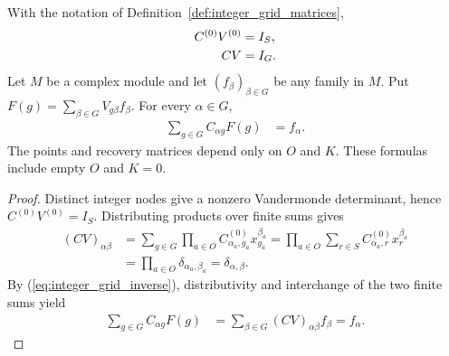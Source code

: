 \begin{theorem}
    \label{thm:integer_grid_recovery}
    \leanok
    With the notation of Definition~\ref{def:integer_grid_matrices},
    \begin{align}
        C^{(0)}V^{(0)} & =I_S,\notag                          \\
        CV             & =I_G.\label{eq:integer_grid_inverse}
    \end{align}
    Let $M$ be a complex module and let $(f_\beta)_{\beta\in G}$ be any family
    in $M$. Put $F(g)=\sum_{\beta\in G}V_{g\beta}f_\beta$.
    For every $\alpha\in G$,
    \begin{align*}
        \sum_{g\in G}C_{\alpha g}F(g) & =f_\alpha.
    \end{align*}
    The points and recovery matrices depend only on $O$ and $K$.
    These formulas include empty $O$ and $K=0$.
\end{theorem}
\begin{proof}\leanok
    Distinct integer nodes give a nonzero Vandermonde determinant, hence
    $C^{(0)}V^{(0)}=I_S$. Distributing products over finite sums gives
    \begin{align*}
        (CV)_{\alpha\beta}
         & =\sum_{g\in G}\prod_{a\in O}
        C^{(0)}_{\alpha_a,g_a}x_{g_a}^{\beta_a}
        =\prod_{a\in O}\sum_{r\in S}
        C^{(0)}_{\alpha_a,r}x_r^{\beta_a}           \\
         & =\prod_{a\in O}\delta_{\alpha_a,\beta_a}
        =\delta_{\alpha,\beta}.
    \end{align*}
    By (\ref{eq:integer_grid_inverse}), distributivity and interchange of the
    two finite sums yield
    \begin{align*}
        \sum_{g\in G}C_{\alpha g}F(g)
         & =\sum_{\beta\in G}(CV)_{\alpha\beta}f_\beta
        =f_\alpha.
    \end{align*}
\end{proof}

